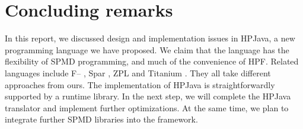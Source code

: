 \section{Concluding remarks}
\label{sec:conclusion}

In this report, we discussed design and implementation issues in
HPJava, a new programming language we have proposed.  We claim that the
language has the flexibility of SPMD programming, and much of the
convenience of HPF. Related languages include F-- \cite{FMM}, Spar
\cite{Spar}, ZPL \cite{ZPL} and Titanium \cite{Titanium}.  They all
take different approaches from ours.  The implementation of HPJava is
straightforwardly supported by a runtime library.  In the next step, we
will complete the HPJava translator and implement further
optimizations.  At the same time, we plan to integrate further SPMD
libraries into the framework.




